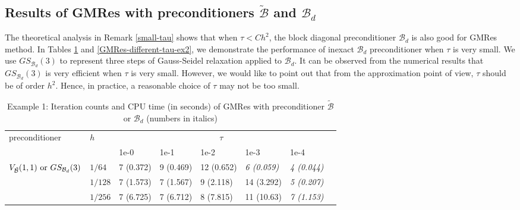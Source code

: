 \documentclass[smallcondensed]{svjour3}
\numberwithin{equation}{section} \numberwithin{table}{section}
\numberwithin{figure}{section}
\numberwithin{algorithm}{section}
\begin{document}
\subsection{Results of GMRes with preconditioners $\tilde{\mathcal{B}}$ and $\mathcal{B}_d$}
The theoretical analysis in Remark \ref{small-tau} shows that when $\tau < Ch^2$, the block diagonal preconditioner $\mathcal{B}_d$ is also good for GMRes method. In Tables \ref{GMRes-different-tau-ex1} and \ref{GMRes-different-tau-ex2}, we demonstrate the performance of inexact $\mathcal{B}_d$ preconditioner when $\tau$ is very small. We use $GS_{\mathcal{B}_d}(3)$ to represent three steps of Gauss-Seidel relaxation applied to $\mathcal{B}_d$. It can be observed from the numerical results that $GS_{\mathcal{B}_d}(3)$ is very efficient when $\tau$ is very small. However, we would like to point out that from the approximation point of view, $\tau$ should be of order $h^2$. Hence, in practice, a reasonable choice of $\tau$ may not be too small.

 \begin{table}
\caption{Example 1: Iteration counts and CPU time (in seconds) of GMRes with preconditioner $\tilde{\mathcal{B}}$ or ${\mathcal{B}_d}$ (numbers in italics)}
\begin{center}
\begin{tabularx}{\linewidth}{m{25mm} *7{X}}
\hline
\multirow{2}{*}{preconditioner} & \multirow{2}{*}{$h$} &\multicolumn{5}{c}{$\tau$} \\
                          \cline{3-7}
                                        &   &1e-0&1e-1&1e-2&1e-3&1e-4\\ 
\hline
\multirow{3}{*}{$V_{\tilde{\mathcal{B}}}(1,1)\  {\rm or} \ GS_{\mathcal{B}_d}(3)$} 
& $1/64$ &   7 (0.372) &   9 (0.469) & 12 (0.652) & {\itshape 6 (0.059)} & {\itshape 4 (0.044)} \\
&$1/128$ &   7 (1.573)   &   7 (1.567) & 9 (2.118) & 14 (3.292) &{\itshape 5 (0.207)} \\
&$1/256$  &   7 (6.725)   &   7 (6.712) &8 (7.815)&11 (10.63) & {\itshape 7 (1.153)}\\
\hline
\end{tabularx}
\end{center}
\label{GMRes-different-tau-ex1}
\end{table}
\end{document}
